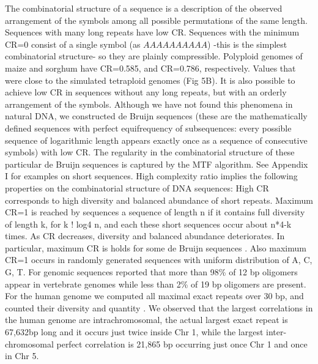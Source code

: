 The combinatorial structure of a sequence is a description of the observed arrangement of the symbols among all possible permutations of the same length. Sequences with many long repeats have low CR. Sequences with the minimum CR=0 consist of a single symbol (as $AAAAAAAAAA$) -this is the simplest combinatorial structure- so they are plainly compressible. Polyploid genomes of maize and sorghum have CR=0.585, and CR=0.786, respectively. Values that were close to the simulated tetraploid genomes (Fig 5B). It is also possible to achieve low CR in sequences without any long repeats, but with an orderly arrangement of the symbols. Although we have not found this phenomena in natural DNA, we constructed de Bruijn sequences (these are the mathematically defined sequences with perfect equifrequency of subsequences: every possible sequence of logarithmic length appears exactly once as a sequence of consecutive symbols) \cite{DeBruijn1946,Becher2011} with low CR. The regularity in the combinatorial structure of these particular de Bruijn sequences is captured by the MTF algorithm. See Appendix I for examples on short sequences. High complexity ratio implies the following properties on the combinatorial structure of DNA sequences: High CR corresponds to high diversity and balanced abundance of short repeats. Maximum CR=1 is reached by sequences a sequence of length n if it contains full diversity of length k, for k ! log4 n, and each these short sequences occur about n*4-k times. As CR decreases, diversity and balanced abundance deteriorates. In particular, maximum CR is holds for some de Bruijn sequences \cite{DeBruijn1946,Becher2011}. Also maximum CR=1 occurs in randomly generated sequences with uniform distribution of A, C, G, T. For genomic sequences \cite{Liu2008} reported that more than 98\% of 12 bp oligomers appear in vertebrate genomes while less than 2\% of 19 bp oligomers are present. For the human genome we computed all maximal exact repeats over 30 bp, and counted their diversity and quantity \cite{Nies2009}. We observed that the largest correlations in the human genome are intrachromosomal, the actual largest exact repeat is 67,632bp long and it occurs just twice inside Chr 1, while the largest inter-chromosomal perfect correlation is 21,865 bp occurring just once Chr 1 and once in Chr 5.

